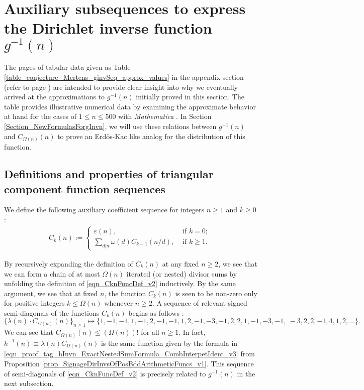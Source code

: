 \documentclass[11pt,reqno,a4letter]{article}
\numberwithin{figure}{section}
\numberwithin{table}{section}
\newcommand{\seqnum}[1]{\href{http://oeis.org/#1}{\color{ProcessBlue}{\underline{#1}}}}
\theoremstyle{plain}
\numberwithin{theorem}{section}
\theoremstyle{definition}
\begin{document}
\newpage
\section{Auxiliary subsequences to express the Dirichlet inverse function $g^{-1}(n)$} 
\label{Section_InvFunc_PreciseExpsAndAsymptotics} 

The pages of tabular data given as Table \ref{table_conjecture_Mertens_ginvSeq_approx_values} 
in the appendix section (refer to 
page \pageref{table_conjecture_Mertens_ginvSeq_approx_values}) are intended to 
provide clear insight into why we eventually arrived at the approximations to 
$g^{-1}(n)$ initially proved in this section. The table provides illustrative 
numerical data by examining the approximate behavior 
at hand for the cases of $1 \leq n \leq 500$ with \emph{Mathematica} 
\cite{SCHMIDT-MERTENS-COMPUTATIONS}. 
In Section \ref{Section_NewFormulasForgInvn}, 
we will use these relations between $g^{-1}(n)$ and 
$C_{\Omega(n)}(n)$ to prove an Erd\"os-Kac like analog for the distribution of this function. 

\subsection{Definitions and properties of triangular component function sequences} 

We define the following auxiliary coefficient sequence for integers $n \geq 1$ and $k \geq 0$: 
\begin{align} 
\label{eqn_CknFuncDef_v2} 
C_k(n) := \begin{cases} 
     \varepsilon(n), & \text{ if $k = 0$; } \\ 
     \sum\limits_{d|n} \omega(d) C_{k-1}(n/d), & \text{ if $k \geq 1$. } 
     \end{cases} 
\end{align} 

By recursively expanding the definition of $C_k(n)$ 
at any fixed $n \geq 2$, we see that 
we can form a chain of at most $\Omega(n)$ iterated (or nested) divisor sums by 
unfolding the definition of \eqref{eqn_CknFuncDef_v2} inductively. 
By the same argument, we see that at fixed $n$, the function 
$C_k(n)$ is seen to be non-zero only for positive integers 
$k \leq \Omega(n)$ whenever $n \geq 2$. 
A sequence of relevant signed semi-diagonals of the functions $C_k(n)$ begins as follows 
\cite[\seqnum{A008480}]{OEIS}: 
\[
\{\lambda(n) \cdot C_{\Omega(n)}(n) \}_{n \geq 1} \mapsto \{
     1, -1, -1, 1, -1, 2, -1, -1, 1, 2, -1, -3, -1, 2, 2, 1, -1, -3, -1, \
     -3, 2, 2, -1, 4, 1, 2, \ldots \}. 
\]
We can see that $C_{\Omega(n)}(n) \leq (\Omega(n))!$ for all $n \geq 1$. In fact, 
$h^{-1}(n) \equiv \lambda(n) C_{\Omega(n)}(n)$ is the same function given by 
the formula in \eqref{eqn_proof_tag_hInvn_ExactNestedSumFormula_CombInterpetIdent_v3} from 
Proposition \ref{prop_SignageDirInvsOfPosBddArithmeticFuncs_v1}. 
This sequence of semi-diagonals of 
\eqref{eqn_CknFuncDef_v2} 
is precisely related to $g^{-1}(n)$ in the next subsection. 
\end{document}
